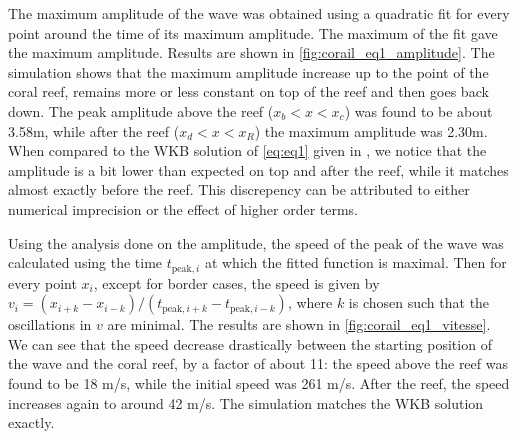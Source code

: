 The maximum amplitude of the wave was obtained using a quadratic fit for every point around the time of its maximum amplitude. The maximum of the fit gave the maximum amplitude. Results are shown in \autoref{fig:corail_eq1_amplitude}. The simulation shows that the maximum amplitude increase up to the point of the coral reef, remains more or less constant on top of the reef and then goes back down. The peak amplitude above the reef (\(x_b < x < x_c\)) was found to be about 3.58m, while after the reef (\(x_d<x<x_R\)) the maximum amplitude was 2.30m. When compared to the WKB solution of \autoref{eq:eq1} given in \cite{physnumbook}, we notice that the amplitude is a bit lower than expected on top and after the reef, while it matches almost exactly before the reef. This discrepency can be attributed to either numerical imprecision or the effect of higher order terms.

Using the analysis done on the amplitude, the speed of the peak of the wave was calculated using the time \(t_{\textrm{peak},i}\) at which the fitted function is maximal. Then for every point \(x_i\), except for border cases, the speed is given by \(v_i = (x_{i+k} - x_{i-k})/(t_{\textrm{peak},i+k} - t_{\textrm{peak},i-k})\), where \(k\) is chosen such that the oscillations in \(v\) are minimal. The results are shown in \autoref{fig:corail_eq1_vitesse}. We can see that the speed decrease drastically between the starting position of the wave and the coral reef, by a factor of about 11: the speed above the reef was found to be 18 m/s, while the initial speed was 261 m/s. After the reef, the speed increases again to around 42 m/s. The simulation matches the WKB solution exactly.

